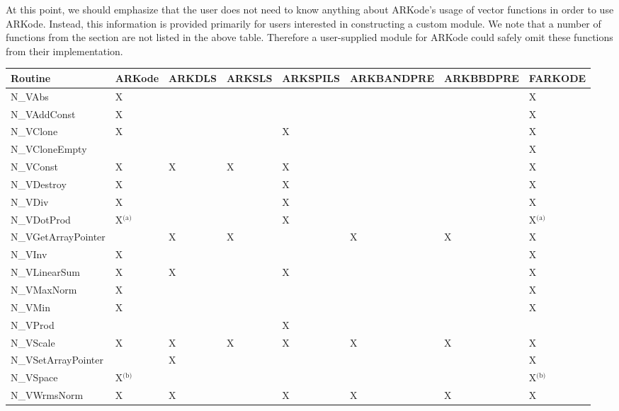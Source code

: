 \documentclass[letterpaper,10pt,english]{sphinxmanual}
\begin{document}
At this point, we should emphasize that the user does not need to know
anything about ARKode's usage of vector functions in order to use
ARKode.  Instead, this information is provided primarily for users
interested in constructing a custom  module.  We note that
a number of  functions from the section
{\hyperref[nvectors/index:nvectors-description]{\emph{}}} are not listed in the above table.
Therefore a user-supplied  module for ARKode could safely
omit these functions from their implementation.

\begin{tabulary}{\linewidth}{|L|L|L|L|L|L|L|L|}
\hline
\textsf{\relax 
Routine
} & \textsf{\relax 
ARKode
} & \textsf{\relax 
ARKDLS
} & \textsf{\relax 
ARKSLS
} & \textsf{\relax 
ARKSPILS
} & \textsf{\relax 
ARKBANDPRE
} & \textsf{\relax 
ARKBBDPRE
} & \textsf{\relax 
FARKODE
}\\
\hline
N\_VAbs
 & 
X
 &  &  &  &  &  & 
X
\\
\hline
N\_VAddConst
 & 
X
 &  &  &  &  &  & 
X
\\
\hline
N\_VClone
 & 
X
 &  &  & 
X
 &  &  & 
X
\\
\hline
N\_VCloneEmpty
 &  &  &  &  &  &  & 
X
\\
\hline
N\_VConst
 & 
X
 & 
X
 & 
X
 & 
X
 &  &  & 
X
\\
\hline
N\_VDestroy
 & 
X
 &  &  & 
X
 &  &  & 
X
\\
\hline
N\_VDiv
 & 
X
 &  &  & 
X
 &  &  & 
X
\\
\hline
N\_VDotProd
 & 
X$^{\text{(a)}}$
 &  &  & 
X
 &  &  & 
X$^{\text{(a)}}$
\\
\hline
N\_VGetArrayPointer
 &  & 
X
 & 
X
 &  & 
X
 & 
X
 & 
X
\\
\hline
N\_VInv
 & 
X
 &  &  &  &  &  & 
X
\\
\hline
N\_VLinearSum
 & 
X
 & 
X
 &  & 
X
 &  &  & 
X
\\
\hline
N\_VMaxNorm
 & 
X
 &  &  &  &  &  & 
X
\\
\hline
N\_VMin
 & 
X
 &  &  &  &  &  & 
X
\\
\hline
N\_VProd
 &  &  &  & 
X
 &  &  & \\
\hline
N\_VScale
 & 
X
 & 
X
 & 
X
 & 
X
 & 
X
 & 
X
 & 
X
\\
\hline
N\_VSetArrayPointer
 &  & 
X
 &  &  &  &  & 
X
\\
\hline
N\_VSpace
 & 
X$^{\text{(b)}}$
 &  &  &  &  &  & 
X$^{\text{(b)}}$
\\
\hline
N\_VWrmsNorm
 & 
X
 & 
X
 &  & 
X
 & 
X
 & 
X
 & 
X
\\
\hline\end{tabulary}
\end{document}
